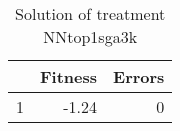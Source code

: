 \begin{table}[ht]
\centering
\begin{tabular}{rrr}
  \hline
 & Fitness & Errors \\ 
  \hline
1 & -1.24 &   0 \\ 
   \hline
\end{tabular}
\caption{Solution of treatment NNtop1sga3k} 
\end{table}
